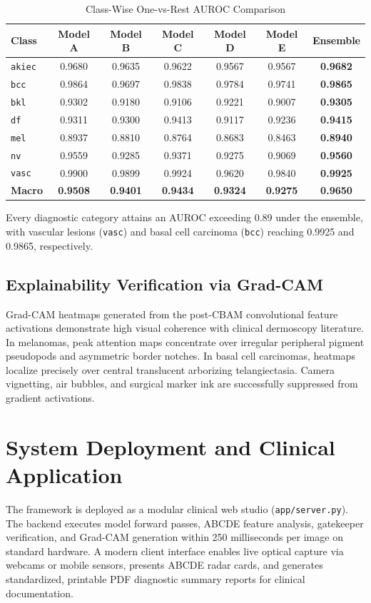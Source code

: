 \documentclass[conference]{IEEEtran}
\begin{document}
\begin{table}[htbp]
\caption{Class-Wise One-vs-Rest AUROC Comparison}
\label{tab:per_class}
\centering
\begin{tabular}{lcccccc}
\toprule
\textbf{Class} & \textbf{Model A} & \textbf{Model B} & \textbf{Model C} & \textbf{Model D} & \textbf{Model E} & \textbf{Ensemble} \\
\midrule
\texttt{akiec} & 0.9680 & 0.9635 & 0.9622 & 0.9567 & 0.9567 & \textbf{0.9682} \\
\texttt{bcc}   & 0.9864 & 0.9697 & 0.9838 & 0.9784 & 0.9741 & \textbf{0.9865} \\
\texttt{bkl}   & 0.9302 & 0.9180 & 0.9106 & 0.9221 & 0.9007 & \textbf{0.9305} \\
\texttt{df}    & 0.9311 & 0.9300 & 0.9413 & 0.9117 & 0.9236 & \textbf{0.9415} \\
\texttt{mel}   & 0.8937 & 0.8810 & 0.8764 & 0.8683 & 0.8463 & \textbf{0.8940} \\
\texttt{nv}    & 0.9559 & 0.9285 & 0.9371 & 0.9275 & 0.9069 & \textbf{0.9560} \\
\texttt{vasc}  & 0.9900 & 0.9899 & 0.9924 & 0.9620 & 0.9840 & \textbf{0.9925} \\
\midrule
\textbf{Macro} & \textbf{0.9508} & \textbf{0.9401} & \textbf{0.9434} & \textbf{0.9324} & \textbf{0.9275} & \textbf{0.9650} \\
\bottomrule
\end{tabular}
\end{table}

Every diagnostic category attains an AUROC exceeding 0.89 under the ensemble, with vascular lesions (\texttt{vasc}) and basal cell carcinoma (\texttt{bcc}) reaching 0.9925 and 0.9865, respectively.

\subsection{Explainability Verification via Grad-CAM}
Grad-CAM heatmaps generated from the post-CBAM convolutional feature activations demonstrate high visual coherence with clinical dermoscopy literature. In melanomas, peak attention maps concentrate over irregular peripheral pigment pseudopods and asymmetric border notches. In basal cell carcinomas, heatmaps localize precisely over central translucent arborizing telangiectasia. Camera vignetting, air bubbles, and surgical marker ink are successfully suppressed from gradient activations.

\section{System Deployment and Clinical Application}
The framework is deployed as a modular clinical web studio (\texttt{app/server.py}). The backend executes model forward passes, ABCDE feature analysis, gatekeeper verification, and Grad-CAM generation within 250 milliseconds per image on standard hardware. A modern client interface enables live optical capture via webcams or mobile sensors, presents ABCDE radar cards, and generates standardized, printable PDF diagnostic summary reports for clinical documentation.
\end{document}
